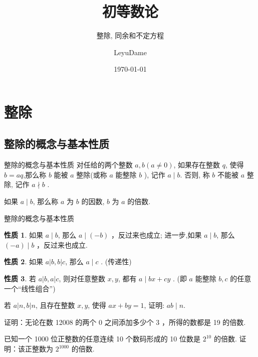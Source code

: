 \documentclass[aspectratio=169]{ctexbeamer}
\title[整除, 同余和不定方程]{初等数论}
\subtitle{整除, 同余和不定方程}
\author[创美营]{LeyuDame}
\date[\today]{\today}
\theoremstyle{definition}
\newtheorem{property}{性质}[section]
\begin{document}
\frame{\titlepage}
\section{整除}
\subsection{整除的概念与基本性质}
\begin{frame}{整除的概念与基本性质}
	对任给的两个整数 $a ,  b(a \neq 0)$, 如果存在整数 $q$, 使得 $b=a q$,那么称 $b$ 能被 $a$ 整除(或称 $a$ 能整除 $b$ ), 记作 $a \mid b$. 否则, 称 $b$ 不能被 $a$ 整除, 记作 $a \nmid b$ .

	如果 $a \mid b$, 那么称 $a$ 为 $b$ 的因数, $b$ 为 $a$ 的倍数.
\end{frame}

\begin{frame}{整除的概念与基本性质}
	\begin{property}
		如果 $a \mid b$, 那么 $a \mid(-b)$ ，反过来也成立; 进一步,如果 $a \mid b$, 那么 $(-a) \mid b$ ，反过来也成立.
	\end{property}
	\begin{property}
		如果 $a|b, b| c$, 那么 $a \mid c$ . (传递性)
	\end{property}
	\begin{property}
		若 $a|b, a| c$, 则对任意整数 $x ,  y$, 都有 $a \mid b x+c y$ . (即 $a$ 能整除 $b ,  c$ 的任意一个“线性组合”)
	\end{property}
\end{frame}

\begin{frame}[t]
	\begin{example}
		若 $a|n, b| n$, 且存在整数 $x ,  y$, 使得 $a x+b y=1$, 证明: $a b \mid n$.
	\end{example}
\end{frame}

\begin{frame}[t]
	\begin{example}
		证明：无论在数 12008 的两个 0 之间添加多少个 3 ，所得的数都是 19 的倍数.
	\end{example}
\end{frame}

\begin{frame}[t]
	\begin{example}
		已知一个 1000 位正整数的任意连续 10 个数码形成的 10 位数是 $2^{10}$ 的倍数. 证明：该正整数为 $2^{1000}$ 的倍数.
	\end{example}
\end{frame}
\end{document}
